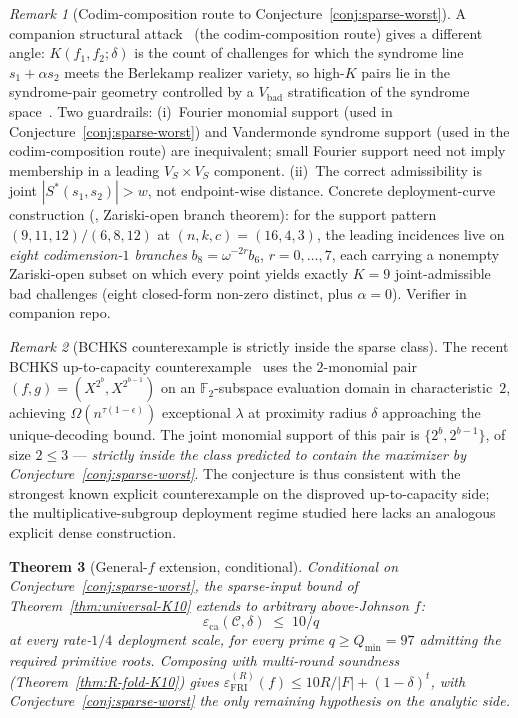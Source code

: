 \documentclass[11pt]{article}
\newtheorem{theorem}{Theorem}[section]
\theoremstyle{definition}
\theoremstyle{remark}
\newtheorem{remark}[theorem]{Remark}
\begin{document}
\begin{remark}[Codim-composition route to Conjecture~\ref{conj:sparse-worst}]
\label{rem:sparse-worst-codim-composition}
A companion structural attack~\cite{CompanionRepo} (the
codim-composition route) gives a different angle:
$K(f_1, f_2; \delta)$ is the count of challenges for which the
syndrome line $s_1 + \alpha s_2$ meets the Berlekamp realizer
variety, so high-$K$ pairs lie in the syndrome-pair geometry
controlled by a $V_{\mathrm{bad}}$ stratification of the syndrome
space~\cite{CompanionRepo}.
Two guardrails: (i)~Fourier monomial support
(used in Conjecture~\ref{conj:sparse-worst}) and Vandermonde
syndrome support (used in the codim-composition route) are
inequivalent; small Fourier support need not imply membership in a
leading $V_S \times V_S$ component. (ii)~The correct admissibility is
joint $|S^\ast(s_1, s_2)| > w$, not endpoint-wise distance.
Concrete deployment-curve construction (\cite{CompanionRepo},
Zariski-open branch theorem): for the support pattern
$(9, 11, 12) / (6, 8, 12)$ at $(n, k, c) = (16, 4, 3)$, the
leading incidences live on \emph{eight codimension-$1$ branches}
$b_8 = \omega^{-2r} b_6$, $r = 0, \ldots, 7$, each carrying a
nonempty Zariski-open subset on which every point yields exactly
$K = 9$ joint-admissible bad challenges (eight closed-form
non-zero distinct, plus $\alpha = 0$). Verifier in companion repo.
\end{remark}

\begin{remark}[BCHKS counterexample is strictly inside the sparse class]
\label{rem:sparse-worst-bghks}
The recent BCHKS up-to-capacity counterexample~\cite{BCHKS} uses the
$2$-monomial pair $(f, g) = (X^{2^b}, X^{2^{b-1}})$ on an
$\mathbb{F}_2$-subspace evaluation domain in characteristic~$2$,
achieving $\Omega(n^{\tau(1{-}\epsilon)})$ exceptional $\lambda$ at
proximity radius $\delta$ approaching the unique-decoding bound. The
joint monomial support of this pair is $\{2^b, 2^{b-1}\}$, of size
$2 \leq 3$ --- \emph{strictly inside the class predicted to contain the
maximizer by Conjecture~\ref{conj:sparse-worst}}. The conjecture is
thus consistent with the strongest known explicit counterexample on
the disproved up-to-capacity side; the multiplicative-subgroup
deployment regime studied here lacks an analogous explicit dense
construction.
\end{remark}

\begin{theorem}[General-$f$ extension, conditional]
\label{thm:K10-sparse-worst-corollary}
Conditional on Conjecture~\ref{conj:sparse-worst}, the
sparse-input bound of Theorem~\ref{thm:universal-K10} extends to
arbitrary above-Johnson $f$:
\[
 \varepsilon_{\mathrm{ca}}(\mathcal{C}, \delta) \;\leq\; 10 / q
\]
at every rate-$1/4$ deployment scale, for every prime
$q \geq Q_{\min} = 97$ admitting the required primitive roots.
Composing with multi-round soundness
(Theorem~\ref{thm:R-fold-K10}) gives
$\varepsilon^{(R)}_{\mathrm{FRI}}(f) \leq 10R/|F| + (1-\delta)^t$,
with Conjecture~\ref{conj:sparse-worst} the only remaining
hypothesis on the analytic side.
\end{theorem}
\end{document}
